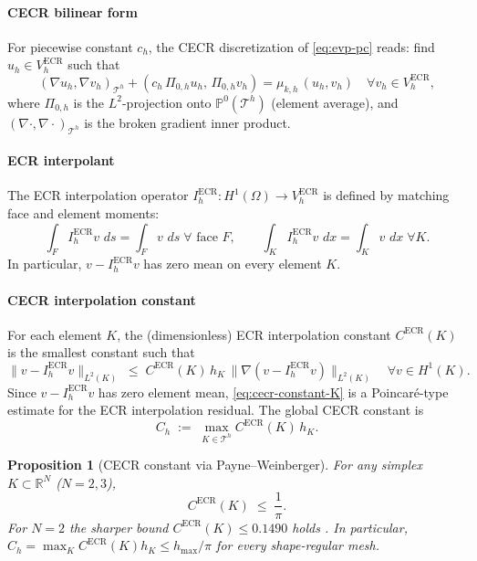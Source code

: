 \documentclass[11pt]{article}
\theoremstyle{plain}
\newtheorem{proposition}{Proposition}
\theoremstyle{definition}
\theoremstyle{remark}
\newcommand{\dx}{\,dx}
\newcommand{\ds}{\,ds}
\newcommand{\ECR}{\mathrm{ECR}}
\begin{document}
\paragraph{CECR bilinear form}
For piecewise constant $c_h$, the CECR discretization of
\eqref{eq:evp-pc} reads: find $u_h \in V_h^{\ECR}$ such that
\begin{equation}
\label{eq:cecr-bilinear}
  (\nabla u_h, \nabla v_h)_{\mathcal{T}^h}
  + (c_h\,\Pi_{0,h} u_h,\, \Pi_{0,h} v_h)
  = \mu_{k,h}\,(u_h,v_h)
  \quad \forall v_h \in V_h^{\ECR},
\end{equation}
where $\Pi_{0,h}$ is the $L^2$-projection onto $\mathbb{P}^0(\mathcal{T}^h)$
(element average), and $(\nabla\cdot,\nabla\cdot)_{\mathcal{T}^h}$
is the broken gradient inner product.

\paragraph{ECR interpolant}
The ECR interpolation operator $I_h^{\ECR}\colon H^1(\Omega)\to V_h^{\ECR}$
is defined by matching face and element moments:
\begin{equation}
\label{eq:ecr-interp}
  \int_F I_h^{\ECR}v\,\ds = \int_F v\,\ds \;\forall\text{ face }F,
  \qquad
  \int_K I_h^{\ECR}v\,\dx = \int_K v\,\dx \;\forall K.
\end{equation}
In particular, $v - I_h^{\ECR}v$ has zero mean on every element $K$.

\paragraph{CECR interpolation constant}
For each element $K$, the (dimensionless) ECR interpolation constant
$C^{\ECR}(K)$ is the smallest constant such that
\begin{equation}
\label{eq:cecr-constant-K}
  \| v - I_h^{\ECR} v \|_{L^2(K)}
  \;\le\; C^{\ECR}(K)\,h_K\,\|\nabla(v - I_h^{\ECR} v)\|_{L^2(K)}
  \quad \forall v \in H^1(K).
\end{equation}
Since $v - I_h^{\ECR}v$ has zero element mean, \eqref{eq:cecr-constant-K}
is a Poincar\'e-type estimate for the ECR interpolation residual.
The global CECR constant is
\begin{equation}
\label{eq:cecr-constant-global}
  C_h \;:=\; \max_{K \in \mathcal{T}^h} C^{\ECR}(K)\,h_K.
\end{equation}

\begin{proposition}[CECR constant via Payne--Weinberger]
\label{prop:cecr-constant-pw}
For any simplex $K\subset\mathbb{R}^N$ ($N=2,3$),
\begin{equation}
\label{eq:cecr-constant-pw}
  C^{\ECR}(K) \;\le\; \frac{1}{\pi}.
\end{equation}
For $N=2$ the sharper bound $C^{\ECR}(K)\le 0.1490$ holds
\cite{Xie2-Liu-2018}.
In particular,
$C_h=\max_K C^{\ECR}(K)h_K \le h_{\max}/\pi$ for every
shape-regular mesh.
\end{proposition}
\end{document}
